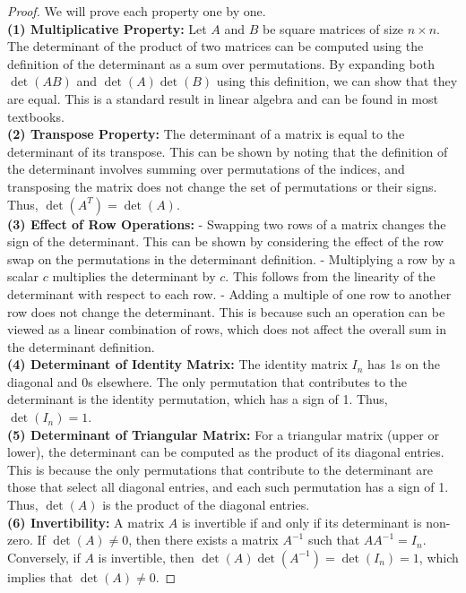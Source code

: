 \documentclass[openany]{book}
\begin{document}
\begin{proof}
    We will prove each property one by one. \\
    \textbf{(1) Multiplicative Property:} Let $A$ and $B$ be square matrices of size $n \times n$. The determinant of the product of two matrices can be computed using the definition of the determinant as a sum over permutations. By expanding both $\det(AB)$ and $\det(A)\det(B)$ using this definition, we can show that they are equal. This is a standard result in linear algebra and can be found in most textbooks. \\
    \textbf{(2) Transpose Property:} The determinant of a matrix is equal to the determinant of its transpose. This can be shown by noting that the definition of the determinant involves summing over permutations of the indices, and transposing the matrix does not change the set of permutations or their signs. Thus, $\det(A^T) = \det(A)$. \\
    \textbf{(3) Effect of Row Operations:} 
        - Swapping two rows of a matrix changes the sign of the determinant. This can be shown by considering the effect of the row swap on the permutations in the determinant definition.
        - Multiplying a row by a scalar $c$ multiplies the determinant by $c$. This follows from the linearity of the determinant with respect to each row.
        - Adding a multiple of one row to another row does not change the determinant. This is because such an operation can be viewed as a linear combination of rows, which does not affect the overall sum in the determinant definition. \\
    \textbf{(4) Determinant of Identity Matrix:} The identity matrix $I_n$ has 1s on the diagonal and 0s elsewhere. The only permutation that contributes to the determinant is the identity permutation, which has a sign of 1. Thus, $\det(I_n) = 1$. \\
    \textbf{(5) Determinant of Triangular Matrix:} For a triangular matrix (upper or lower), the determinant can be computed as the product of its diagonal entries. This is because the only permutations that contribute to the determinant are those that select all diagonal entries, and each such permutation has a sign of 1. Thus, $\det(A)$ is the product of the diagonal entries. \\
    \textbf{(6) Invertibility:} A matrix $A$ is invertible if and only if its determinant is non-zero. If $\det(A) \neq 0$, then there exists a matrix $A^{-1}$ such that $AA^{-1} = I_n$. Conversely, if $A$ is invertible, then $\det(A)\det(A^{-1}) = \det(I_n) = 1$, which implies that $\det(A) \neq 0$.
\end{proof}
\end{document}
